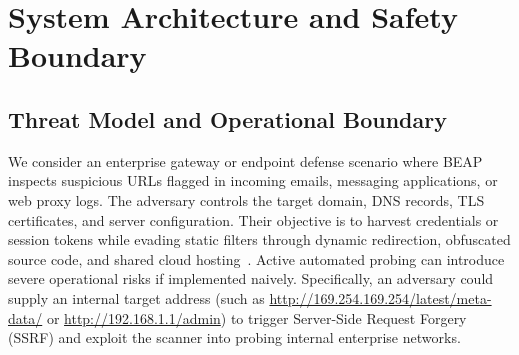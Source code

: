 \documentclass[conference]{IEEEtran}
\begin{document}
\begin{table}[t]
\caption{Systematic positioning of BEAP against representative phishing detection paradigms.}
\label{tab:positioning}
\centering
{}
\end{table}

\section{System Architecture and Safety Boundary}\label{system-architecture}

\subsection{Threat Model and Operational Boundary}\label{threat-model}

We consider an enterprise gateway or endpoint defense scenario where BEAP inspects suspicious URLs flagged in incoming emails, messaging applications, or web proxy logs. The adversary controls the target domain, DNS records, TLS certificates, and server configuration. Their objective is to harvest credentials or session tokens while evading static filters through dynamic redirection, obfuscated source code, and shared cloud hosting~\cite{castano2023,reyes2024}. Active automated probing can introduce severe operational risks if implemented naively. Specifically, an adversary could supply an internal target address (such as \url{http://169.254.169.254/latest/meta-data/} or \url{http://192.168.1.1/admin}) to trigger Server-Side Request Forgery (SSRF) and exploit the scanner into probing internal enterprise networks.
\end{document}
